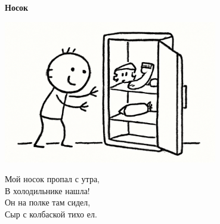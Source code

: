 \vspace*{\fill}
\begin{center}
  {\huge\textbf{Носок}}

  \vspace{1.5em}  \includegraphics[width=0.7\textwidth]{pictures/sock.png}
  \vspace{4em}
  \parbox{0.6\textwidth}{
    \LARGE
    \begin{spacing}{1.2}
      Мой носок пропал с утра,\\
      В холодильнике нашла!\\
      Он на полке там сидел,\\
      Сыр с колбаской тихо ел. %
    \end{spacing}
      
  }
\end{center}
\vspace*{\fill}